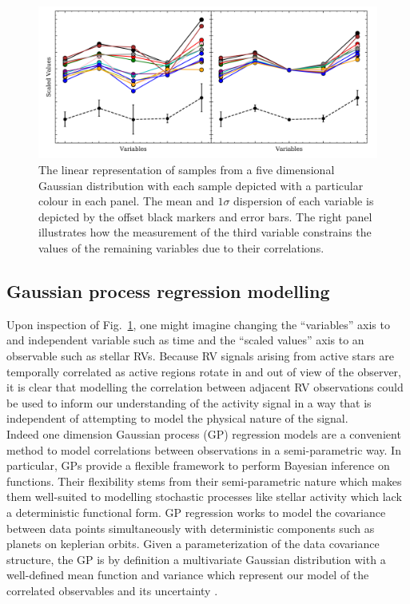 \begin{figure}
  \centering
  \includegraphics[width=\hsize]{figures/linearrep_v2.png}
  \caption[Linear representation of Gaussian random variables in five dimensions.]
          {The linear representation of samples from a five dimensional Gaussian
            distribution with each sample depicted with a particular colour in each
            panel. The mean and $1\sigma$ dispersion of each variable is depicted
            by the offset black markers and error bars. The right panel illustrates
            how the measurement of the third variable constrains the values of the
            remaining variables due to their correlations.}
  \label{fig:linrepv2}
\end{figure}


\subsection{Gaussian process regression modelling} \label{sect:regression}
Upon inspection of Fig.~\ref{fig:linrepv2}, one might imagine changing the ``variables''
axis to and independent variable such as time and the ``scaled values'' axis to an
observable such as stellar RVs. Because RV signals arising from active stars are temporally
correlated as active regions rotate in and out of view of the observer, it is clear that
modelling the correlation between adjacent RV observations could be used to inform
our understanding of the activity signal in a way that is independent of attempting to
model the physical nature of the signal. \\

Indeed one dimension Gaussian process (GP) regression models are a convenient method to model
correlations between observations in a semi-parametric way. In particular, GPs provide a
flexible framework to perform Bayesian inference on functions. Their flexibility stems from
their semi-parametric nature which makes them well-suited to modelling stochastic processes
like stellar activity which lack a deterministic functional form. GP regression works to model
the covariance between data points simultaneously with deterministic components such as planets
on keplerian orbits. Given a parameterization of the data covariance structure, the GP is
by definition a multivariate Gaussian distribution with a well-defined mean function and
variance which represent our model of the correlated observables and its uncertainty
\citep{rasmussen05}. \\

